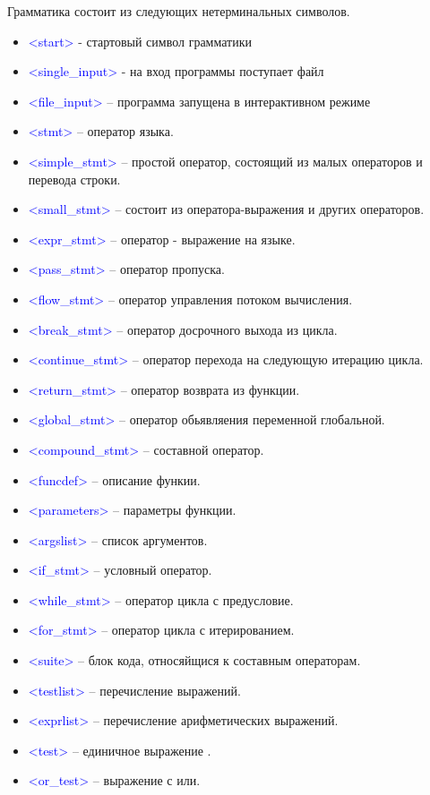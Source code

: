 \documentclass[russian,a4paper]{article}
\newcommand{\ns}[1]{\textcolor{blue}{<#1>}}
\begin{document}
Грамматика состоит из следующих нетерминальных символов.
\begin{itemize}
\item \ns{start} - стартовый символ грамматики
\item \ns{single\_input}  - на вход программы поступает файл
\item \ns{file\_input} -- программа запущена в интерактивном режиме
 \item \ns{stmt}  -- оператор языка.
 \item \ns{simple\_stmt}  -- простой оператор, состоящий из малых операторов и перевода строки.
 \item \ns{small\_stmt}  -- состоит из оператора-выражения и других операторов.
 \item \ns{expr\_stmt}  -- оператор - выражение на языке.
 \item \ns{pass\_stmt}  -- оператор пропуска.
 \item \ns{flow\_stmt}  -- оператор управления потоком вычисления.
 \item \ns{break\_stmt}  -- оператор досрочного выхода из цикла.
 \item \ns{continue\_stmt}  -- оператор перехода на следующую итерацию цикла.
 \item \ns{return\_stmt}  -- оператор возврата из функции.
 \item \ns{global\_stmt}  -- оператор обьявляения переменной глобальной.
\\
 \item \ns{compound\_stmt}  -- составной оператор.
 \item \ns{funcdef}  -- описание функии.
 \item \ns{parameters}  -- параметры функции.
 \item \ns{argslist}  -- список аргументов.
 \item \ns{if\_stmt}  -- условный оператор.
 \item \ns{while\_stmt}  -- оператор цикла с предусловие.
 \item \ns{for\_stmt}  -- оператор цикла с итерированием.
 \item \ns{suite}  -- блок кода, относяйщися к составным операторам.
\\ 
 \item \ns{testlist}  -- перечисление выражений.
 \item \ns{exprlist}  -- перечисление арифметических выражений.
 \item \ns{test}  -- единичное выражение .
 \item \ns{or\_test}  -- выражение с или.

\end{itemize}
\end{document}

